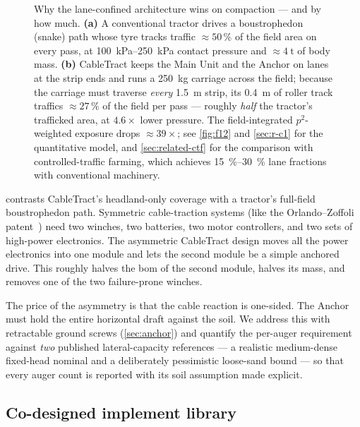 \documentclass[11pt,a4paper]{article}
\begin{document}
\begin{figure}[H]
\begin{tikzpicture}
\end{tikzpicture}
\caption{Why the lane-confined architecture wins on compaction --- and by how much. \textbf{(a)} A conventional tractor drives a boustrophedon (snake) path whose tyre tracks traffic ${\approx}50\,\%$ of the field area on every pass, at \SIrange{100}{250}{\kilo\pascal} contact pressure and ${\approx}\SI{4}{\tonne}$ of body mass. \textbf{(b)} CableTract keeps the Main Unit and the Anchor on lanes at the strip ends and runs a \SI{250}{\kilogram} carriage across the field; because the carriage must traverse \emph{every} \SI{1.5}{\meter} strip, its \SI{0.4}{\meter} of roller track traffics ${\approx}27\,\%$ of the field per pass --- roughly \emph{half} the tractor's trafficked area, at $4.6\times$ lower pressure. The field-integrated $p^2$-weighted exposure drops ${\approx}39\times$; see \cref{fig:f12} and \cref{sec:r-c1} for the quantitative model, and \cref{sec:related-ctf} for the comparison with controlled-traffic farming, which achieves \SIrange{15}{30}{\percent} lane fractions with conventional machinery.}
\label{fig:f0d}
\end{figure}

 contrasts CableTract's headland-only coverage with a tractor's full-field boustrophedon path. Symmetric cable-traction systems (like the Orlando--Zoffoli patent~\cite{orlando2014patent}) need two winches, two batteries, two motor controllers, and two sets of high-power electronics. The asymmetric CableTract design moves all the power electronics into one module and lets the second module be a simple anchored drive. This roughly halves the \gls{bom} of the second module, halves its mass, and removes one of the two failure-prone winches.

The price of the asymmetry is that the cable reaction is one-sided. The Anchor must hold the entire horizontal draft against the soil. We address this with retractable ground screws (\cref{sec:anchor}) and quantify the per-auger requirement against \emph{two} published lateral-capacity references --- a realistic medium-dense fixed-head nominal and a deliberately pessimistic loose-sand bound --- so that every auger count is reported with its soil assumption made explicit.

\subsection{Co-designed implement library}\label{sec:codesign}
\end{document}
